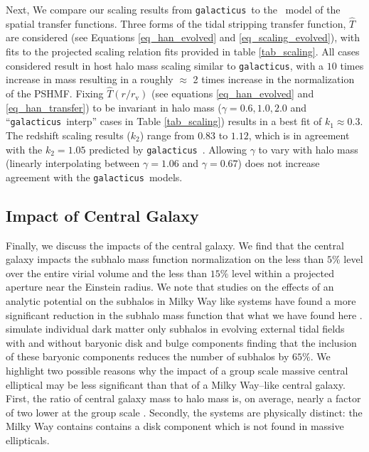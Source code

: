 \documentclass[%
 reprint,
 amsmath,
 amssymb,
 aps,
prd,
twocolumn,
superscriptaddress,
preprintnumbers,
floatfix,
nofootinbib
]{revtex4-2}
\def\gal{{\tt galacticus}~}
\def\galns{{\tt galacticus}}
\def\hanetal{\citet{10.1093/mnras/stv2900}~}
\newcommand{\reftable}[1]{Table \ref{#1}}
\begin{document}
Next, We compare our scaling results from \gal to the \hanetal model of the spatial transfer functions.
Three forms of the tidal stripping transfer function, $\hat{T}$ are considered (see Equations \ref{eq_han_evolved} and \ref{eq_scaling_evolved}), with fits to the projected scaling relation fits provided in table \ref{tab_scaling}.
All cases considered result in host halo mass scaling similar to \galns, with a $10$ times increase in mass resulting in a roughly $\approx$ 2 times increase in the normalization of the PSHMF.
Fixing $\hat{T}(r / r_{\mathrm{v}})$ (see equations \ref{eq_han_evolved} and \ref{eq_han_transfer}) to be invariant in halo mass ($\gamma = 0.6, 1.0, 2.0$ and ``\gal interp'' cases in \reftable{tab_scaling}) results in a best fit of $k_1 \approx 0.3$.
The redshift scaling results ($k_2$) range from $0.83$ to $1.12$, which is in agreement with the $k_2 = 1.05$ predicted by \gal.
Allowing $\gamma$ to vary with halo mass (linearly interpolating between $\gamma = 1.06$ and $\gamma = 0.67$) does not increase agreement with the \gal models.





 \subsection{Impact of Central Galaxy}
 Finally, we discuss the impacts of the central galaxy. 
 We find that the central galaxy impacts the subhalo mass function normalization on the less than $5 \%$ level over the entire virial volume and the less than $15 \%$ level within a projected aperture near the Einstein radius. 
 We note that studies on the effects of an analytic potential on the subhalos in Milky Way like systems have found a more significant reduction in the subhalo mass function that what we have found here \citep{d2010substructure, webb2020high}.
 \citet{webb2020high} simulate individual dark matter only subhalos in evolving external tidal fields with and without baryonic disk and bulge components finding that the inclusion of these baryonic components reduces the number of subhalos by $65 \%$.
 We highlight two possible reasons why the impact of a group scale massive central elliptical may be less significant than that of a Milky Way–like central galaxy.
 First, the ratio of central galaxy mass to halo mass is, on average, nearly a factor of two lower at the group scale \citep{Behroozi_2019}.
 Secondly, the systems are physically distinct: the Milky Way contains contains a disk component which is not found in massive ellipticals.
\end{document}
